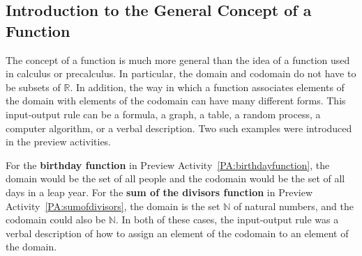 \subsection*{Introduction to the General Concept of a Function}
The concept of a function is much more general than the idea of a function used in calculus or precalculus.  In particular, the domain and codomain do not have to be subsets of  $\mathbb{R}$.  In addition, the way in which a function associates elements of the domain with elements of the codomain can have many different forms.  This input-output rule can be a formula, a graph, a table, a random process, a computer algorithm, or a verbal description.  Two such examples were introduced in the preview activities.

For the \textbf{birthday function}
%
 in Preview Activity~\ref{PA:birthdayfunction}, the domain would be the set of all people and the codomain would be the set of all days in a leap year.  For the \textbf{sum of the divisors function}
%
 in Preview Activity~\ref{PA:sumofdivisors}, the domain is the set  $\mathbb{N}$ of natural numbers, and the codomain could also be  $\mathbb{N}$.  In both of these cases, the input-output rule was a verbal description of how to assign an element of the codomain to an element of the domain.

